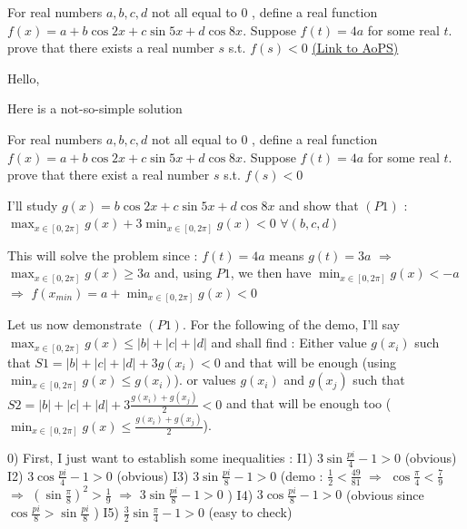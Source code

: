 \begin{problem}
	For real numbers $a,b,c,d$ not all equal to $0$ , define a real function $f(x) = a +b\cos{2x} + c\sin{5x} +d \cos{8x}$. Suppose $f(t) = 4a$ for some real $t$. prove that there exists a real number $s$ s.t. $f(s)<0$
	\flushright \href{https://artofproblemsolving.com/community/c6h53000}{(Link to AoPS)}
\end{problem}



\begin{mysolution}
	Hello,

Here is a not-so-simple solution

\begin{tcolorbox}For real numbers $a,b,c,d$ not all equal to $0$ , define a real function $f(x) = a+b\cos{2x}+c\sin{5x}+d \cos{8x}$. Suppose $f(t) = 4a$ for some real $t$. prove that there exist a real number $s$ s.t. $f(s)<0$\end{tcolorbox}

I'll study $g(x)=b\cos{2x}+c\sin{5x}+d \cos{8x}$ and show that $(P1)$ :$\max_{x\in[0,2\pi]}g(x)+3\min_{x\in[0,2\pi]}g(x)<0$ $\forall (b,c,d)$

This will solve the problem since :
$f(t)=4a$ means $g(t)=3a$ $\Rightarrow $ $\max_{x\in[0,2\pi]}g(x)\geq 3a$ and, using $P1$, we then have $\min_{x\in[0,2\pi]}g(x)<-a$ $\Rightarrow $ $f(x_{min})=a+\min_{x\in[0,2\pi]}g(x)<0$

Let us now demonstrate $(P1)$. For the following of the demo, I'll say $\max_{x\in[0,2\pi]}g(x)\leq |b|+|c|+|d|$ and shall find :
Either value $g(x_{i})$ such that $S1=|b|+|c|+|d|+3g({x_{i}})<0$ and that will be enough (using  $\min_{x\in[0,2\pi]}g(x)\leq g(x_{i})$).
or values  $g(x_{i})$ and  $g(x_{j})$ such that $S2=|b|+|c|+|d|+3\frac{g({x_{i}})+g(x_{j})}{2}<0$ and that will be enough too ($\min_{x\in[0,2\pi]}g(x)\leq \frac{g({x_{i}})+g(x_{j})}{2}$).

0) First, I just want to establish some inequalities :
I1) $3\sin{\frac{pi}{4}}-1>0$ (obvious)
I2) $3\cos{\frac{pi}{4}}-1>0$ (obvious)
I3) $3\sin{\frac{pi}{8}}-1>0$ (demo : $\frac{1}{2}<\frac{49}{81}$ $\Rightarrow $ $\cos{\frac{\pi}{4}}<\frac{7}{9}$ $\Rightarrow $ $(\sin{\frac{\pi}{8}})^{2}>\frac{1}{9}$  $\Rightarrow $ $3\sin{\frac{pi}{8}}-1>0$ )
I4) $3\cos{\frac{pi}{8}}-1>0$ (obvious since $\cos{\frac{pi}{8}}>\sin{\frac{pi}{8}}$ )
I5) $\frac{3}{2}\sin{\frac{\pi}{4}}-1>0$ (easy to check)



\end{mysolution}

